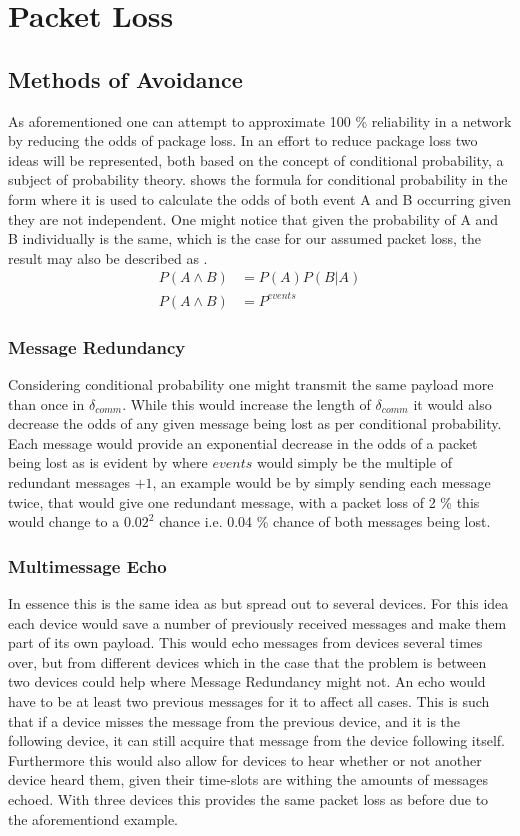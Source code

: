 \section{Packet Loss}
\subsection{Methods of Avoidance}
As aforementioned one can attempt to approximate 100 \% reliability in a network by reducing the odds of package loss.
In an effort to reduce package loss two ideas will be represented, both based on the concept of conditional probability, a subject of probability theory.
 shows the formula for conditional probability in the form where it is used to calculate the odds of both event A and B occurring given they are not independent.
One might notice that given the probability of A and B individually is the same, which is the case for our assumed packet loss, the result may also be described as .
\begin{align}
P(A \land B) &= P(A)P(B|A) \label{eq:conditionalProb} \\  
P(A \land B) &= P^{events} \label{eq:conditionalProb2}
\end{align}

\subsubsection*{Message Redundancy}\label{redundancy}
Considering conditional probability one might transmit the same payload more than once in $\delta_{comm}$.
While this would increase the length of $\delta_{comm}$ it would also decrease the odds of any given message being lost as per conditional probability.
Each message would provide an exponential decrease in the odds of a packet being lost as is evident by  where $events$ would simply be the multiple of redundant messages $+ 1$, an example would be by simply sending each message twice, that would give one redundant message, with a packet loss of 2 \% this would change to a $0.02^2$ chance i.e. 0.04 \% chance of both messages being lost.

\subsubsection*{Multimessage Echo}
In essence this is the same idea as  but spread out to several devices.
For this idea each device would save a number of previously received messages and make them part of its own payload.
This would echo messages from devices several times over, but from different devices which in the case that the problem is between two devices could help where Message Redundancy might not.
An echo would have to be at least two previous messages for it to affect all cases.
This is such that if a device misses the message from the previous device, and it is the following device, it can still acquire that message from the device following itself.
Furthermore this would also allow for devices to hear whether or not another device heard them, given their time-slots are withing the amounts of messages echoed.
With three devices this provides the same packet loss as before due to the aforementiond example.
